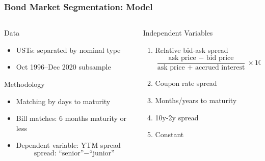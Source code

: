 \documentclass[11pt, handout, aspectratio=169]{beamer}
\newenvironment{wideitemize}{\itemize\addtolength{\itemsep}{10pt}}{\enditemize}
\begin{document}
\begin{frame}
	\frametitle{Bond Market Segmentation: Model}
	\label{slide:Model}
	\begin{columns}[t]
		\begin{column}{0.49\textwidth}
			\begin{wideitemize}
				\item Data
				\begin{itemize}
					\item USTs: separated by nominal type
					\item Oct 1996--Dec 2020 subsample
				\end{itemize}
				\item Methodology
				\begin{itemize}
					\item Matching by days to maturity
					\item Bill matches: 6 months maturity or less
					\item Dependent variable: YTM spread
					$$\text{spread: } \text{``senior''}-\text{``junior''} $$
				\end{itemize}
			\end{wideitemize}
		\end{column}
		\begin{column}{0.49\textwidth}
			\begin{wideitemize}
				\item Independent Variables
				\begin{enumerate}
					\item Relative bid-ask spread
						$$ \frac{\text{ask price }-\text{ bid price}}{\text{ask price }+\text{ accrued interest}}\times 100.$$
					\item Coupon rate spread
					\item Months/years to maturity
					\item 10y-2y spread
					\item Constant
				\end{enumerate}
			\end{wideitemize}
		\end{column}
	\end{columns}
	\vfill
	\hfill \hyperlink{slide:UST_Market}{}
\end{frame}
\end{document}
